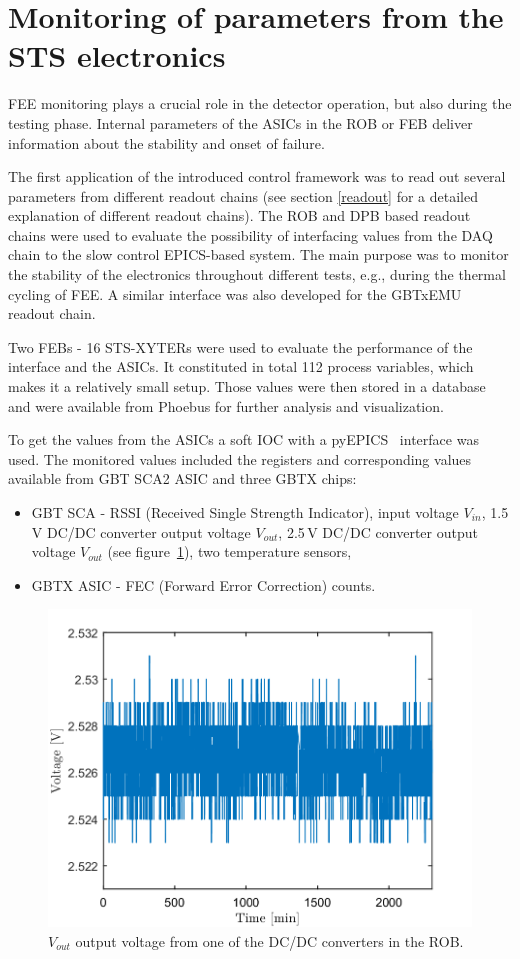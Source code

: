 
\section{Monitoring of parameters from the STS electronics}

\gls{FEE} monitoring plays a crucial role in the detector operation, but also during the testing phase. Internal parameters of the \glspl{ASIC} in the \gls{ROB} or \gls{FEB} deliver information about the stability and onset of failure.


The first application of the introduced control framework was to read out several parameters from different readout chains (see section \ref{readout} for a detailed explanation of different readout chains). The \gls{ROB} and \gls{DPB} based readout chains were used to evaluate the possibility of interfacing values from the \gls{DAQ} chain to the slow control \gls{EPICS}-based system. The main purpose was to monitor the stability of the electronics throughout different tests, e.g., during the thermal cycling of \gls{FEE}. A similar interface was also developed for the GBTxEMU readout chain. 

Two \glspl{FEB} - 16 STS-XYTERs were used to evaluate the performance of the interface and the ASICs. It constituted in total 112 process variables, which makes it a relatively small setup. Those values were then stored in a database and were available from Phoebus for further analysis and visualization.

To get the values from the \glspl{ASIC} a soft \gls{IOC} with a pyEPICS~\cite{pyEPICS} interface was used. The monitored values included the registers and corresponding values available from \gls{GBT} \gls{SCA2} \gls{ASIC} \cite{GBT_SCA_ASIC} and three GBTX chips: 
\begin{itemize}
    \item GBT SCA - RSSI (Received Single Strength Indicator), input voltage $V_{in}$, 1.5\,V DC/DC converter output voltage $V_{out}$, 2.5\,V DC/DC converter output voltage $V_{out}$ (see figure~\ref{fig:ROB}), two temperature sensors,
    \item GBTX \gls{ASIC} - FEC (Forward Error Correction) counts.
\end{itemize}

\begin{figure}[!h]
    \centering
    \includegraphics[width=0.65\columnwidth]{Chapter4/images/ROB.png}
    \caption{$V_{out}$ output voltage from one of the DC/DC converters in the \gls{ROB}.}
    \label{fig:ROB}
\end{figure}

